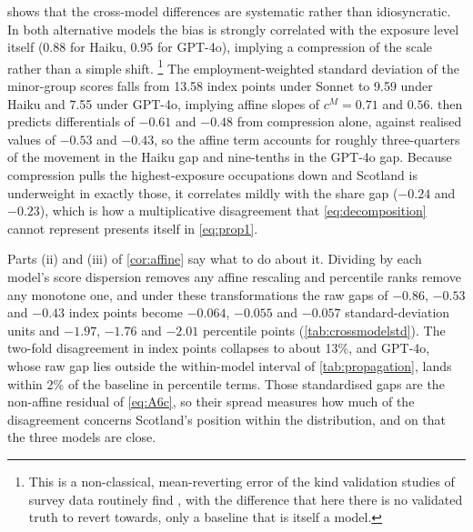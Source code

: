  shows that the cross-model differences are systematic rather than idiosyncratic. In both alternative models the bias is strongly correlated with the exposure level itself (0.88 for Haiku, 0.95 for GPT-4o), implying a compression of the scale rather than a simple shift. \footnote{This is a non-classical, mean-reverting error of the kind validation studies of survey data routinely find \citep{bound1991}, with the difference that here there is no validated truth to revert towards, only a baseline that is itself a model.} The employment-weighted standard deviation of the minor-group scores falls from 13.58 index points under Sonnet to 9.59 under Haiku and 7.55 under GPT-4o, implying affine slopes of $c^{M} = 0.71$ and $0.56$.  then predicts differentials of $-0.61$ and $-0.48$ from compression alone, against realised values of $-0.53$ and $-0.43$, so the affine term accounts for roughly three-quarters of the movement in the Haiku gap and nine-tenths in the GPT-4o gap. Because compression pulls the highest-exposure occupations down and Scotland is underweight in exactly those, it correlates mildly with the share gap ($-0.24$ and $-0.23$), which is how a multiplicative disagreement that \cref{eq:decomposition} cannot represent presents itself in \cref{eq:prop1}.
 
Parts (ii) and (iii) of \cref{cor:affine} say what to do about it. Dividing by each model's score dispersion removes any affine rescaling and percentile ranks remove any monotone one, and under these transformations the raw gaps of $-0.86$, $-0.53$ and $-0.43$ index points become $-0.064$, $-0.055$ and $-0.057$ standard-deviation units and $-1.97$, $-1.76$ and $-2.01$ percentile points (\cref{tab:crossmodelstd}). The two-fold disagreement in index points collapses to about 13\%, and GPT-4o, whose raw gap lies outside the within-model interval of \cref{tab:propagation}, lands within 2\% of the baseline in percentile terms. Those standardised gaps are the non-affine residual of \cref{eq:A6c}, so their spread measures how much of the disagreement concerns Scotland's position within the distribution, and on that the three models are close.
 
